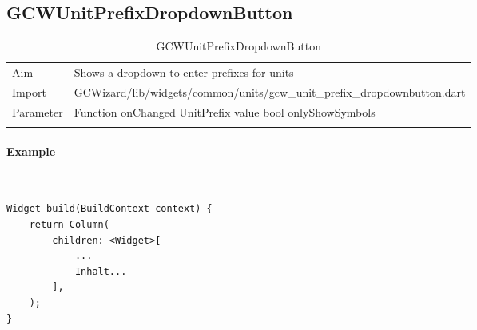 \newpage
\subsection{GCWUnitPrefixDropdownButton}
\label{fig: GCWUnitPrefixDropdownButton}
\begin{table}[H]
\begin{tabular}[h]{p{2cm}p{9cm}}
    \caption{GCWUnitPrefixDropdownButton}
    Aim       & Shows a dropdown to enter prefixes for units\\
    Import    & GCWizard/lib/widgets/common/units/gcw\_unit\_prefix\_dropdownbutton.dart\\
    Parameter & Function onChanged\newline
                UnitPrefix value\newline
                bool onlyShowSymbols\\
    \label{tab:GCWUnitPrefixDropdownButton}
\end{tabular}
\end{table}
\paragraph*{Example} \,
\begin{lstlisting}
Widget build(BuildContext context) {
    return Column(
        children: <Widget>[
            ...
            Inhalt...
        ],
    );
}
\end{lstlisting}
\label{fig: ExampleGCWUnitPrefixDropdownButton}

\newpage

